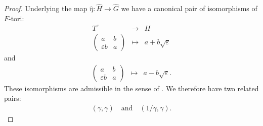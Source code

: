 \documentclass[11pt]{amsart}
\numberwithin{equation}{section}
\newcommand{\<}{\left\langle}
\renewcommand{\>}{\right\rangle}
\begin{document}
 \begin{proof}   Underlying the map $\widehat{\eta} \colon \widehat{H} \to \widehat{G}$ we have  a canonical pair of isomorphisms of $F$-tori:
   \begin{eqnarray*}
  T^\varepsilon & \to & H\\
  \left(\begin{array}{cc} 
   a & b\\
 \varepsilon b & a
 \end{array}
 \right)
   & \mapsto &  a + b \sqrt{\varepsilon}
   \end{eqnarray*}
   and
    \begin{eqnarray*}
     \left(\begin{array}{cc} 
   a & b\\
 \varepsilon b & a
 \end{array}
 \right)
   & \mapsto &  a - b \sqrt{\varepsilon}.
   \end{eqnarray*}
   These isomorphisms are admissible in the sense of \cite[\S3]{Ka2}.     
   We therefore have two related pairs: 
  \begin{eqnarray}\label{RP}
    (\gamma, \gamma)\quad \textrm{and} \quad (1/\gamma, \gamma). 
  \end{eqnarray}    
 

\end{proof}
\end{document}
